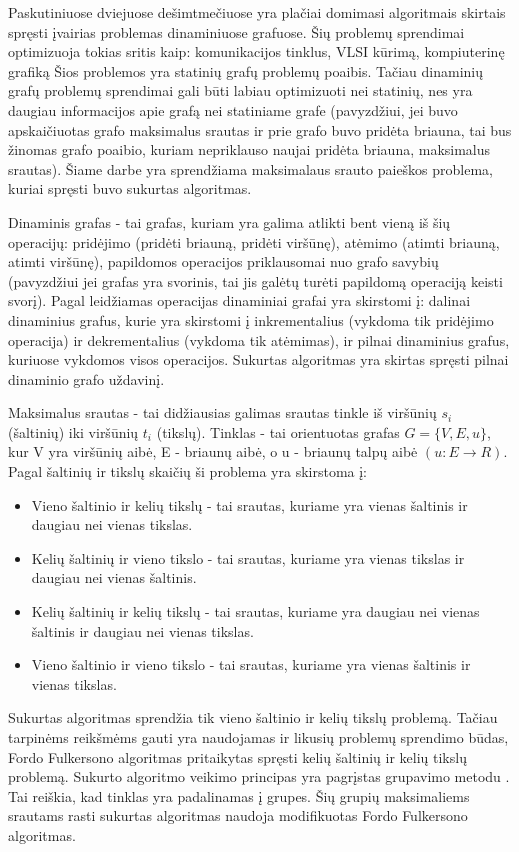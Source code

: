 Paskutiniuose dviejuose dešimtmečiuose yra plačiai domimasi algoritmais skirtais spręsti įvairias problemas dinaminiuose grafuose. Šių problemų sprendimai optimizuoja tokias sritis kaip: komunikacijos tinklus, VLSI kūrimą, kompiuterinę grafiką \cite{DynamicGraphs, DGA} Šios problemos yra statinių grafų problemų poaibis. Tačiau dinaminių grafų problemų sprendimai gali būti labiau optimizuoti nei statinių, nes yra daugiau informacijos apie grafą nei statiniame grafe (pavyzdžiui, jei buvo apskaičiuotas grafo maksimalus srautas ir prie grafo buvo pridėta briauna, tai bus žinomas grafo poaibio, kuriam nepriklauso naujai pridėta briauna, maksimalus srautas). Šiame darbe yra sprendžiama maksimalaus srauto paieškos problema, kuriai spręsti buvo sukurtas algoritmas.

Dinaminis grafas - tai grafas, kuriam yra galima atlikti bent vieną iš šių operacijų: pridėjimo (pridėti briauną, pridėti viršūnę), atėmimo (atimti briauną, atimti viršūnę), papildomos operacijos priklausomai nuo grafo savybių (pavyzdžiui jei grafas yra svorinis, tai jis galėtų turėti papildomą operaciją keisti svorį). Pagal leidžiamas operacijas dinaminiai grafai yra skirstomi į: dalinai dinaminius grafus, kurie yra skirstomi į inkrementalius (vykdoma tik pridėjimo operacija) ir dekrementalius (vykdoma tik atėmimas), ir pilnai dinaminius grafus, kuriuose vykdomos visos operacijos. Sukurtas algoritmas yra skirtas spręsti pilnai dinaminio grafo uždavinį.

Maksimalus srautas - tai didžiausias galimas srautas tinkle iš viršūnių $s_i$ (šaltinių) iki viršūnių $t_i$ (tikslų). Tinklas - tai orientuotas grafas $G= \{V, E, u\}$, kur V yra viršūnių aibė, E - briaunų aibė, o u - briaunų talpų aibė $( u : E \rightarrow R )$. Pagal šaltinių ir tikslų skaičių ši problema yra skirstoma į:
\begin{itemize}
	\item Vieno šaltinio ir kelių tikslų - tai srautas, kuriame yra vienas šaltinis ir daugiau nei vienas tikslas.
	\item Kelių šaltinių ir vieno tikslo - tai srautas, kuriame yra vienas tikslas ir daugiau nei vienas šaltinis.
	\item Kelių šaltinių ir kelių tikslų  - tai srautas, kuriame yra daugiau nei vienas šaltinis ir daugiau nei vienas tikslas.
	\item Vieno šaltinio ir vieno tikslo - tai srautas, kuriame yra vienas šaltinis ir vienas tikslas.
\end{itemize}
Sukurtas algoritmas sprendžia tik vieno šaltinio ir kelių tikslų problemą. Tačiau tarpinėms reikšmėms gauti yra naudojamas ir likusių problemų sprendimo būdas, Fordo Fulkersono algoritmas  \cite{FiN} pritaikytas spręsti kelių šaltinių ir kelių tikslų problemą. Sukurto algoritmo veikimo principas yra pagrįstas grupavimo metodu \cite{DSfUoMST}. Tai reiškia, kad tinklas yra padalinamas į grupes. Šių grupių maksimaliems srautams rasti sukurtas algoritmas naudoja modifikuotas Fordo Fulkersono algoritmas.

